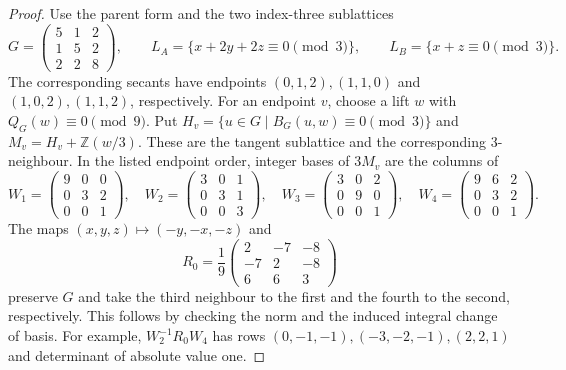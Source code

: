 \documentclass[11pt,letterpaper]{amsart}
\theoremstyle{definition}
\numberwithin{equation}{section}
\newcommand{\Z}{\mathbb Z}
\begin{document}
\begin{proof}
Use the parent form and the two index-three sublattices
\[
 G=\begin{pmatrix}5&1&2\\1&5&2\\2&2&8\end{pmatrix},\qquad
 L_A=\{x+2y+2z\equiv0\pmod3\},\qquad
 L_B=\{x+z\equiv0\pmod3\}.
\]
The corresponding secants have endpoints \((0,1,2),(1,1,0)\) and
\((1,0,2),(1,1,2)\), respectively. For an endpoint \(v\), choose a
lift \(w\) with \(Q_G(w)\equiv0\pmod9\). Put
\(H_v=\{u\in G\mid B_G(u,w)\equiv0\pmod3\}\) and
\(M_v=H_v+\Z(w/3)\). These are the tangent sublattice and the
corresponding 3-neighbour. In the listed endpoint order, integer
bases of \(3M_v\) are the columns of
\[
 W_1=\begin{pmatrix}9&0&0\\0&3&2\\0&0&1\end{pmatrix},\quad
 W_2=\begin{pmatrix}3&0&1\\0&3&1\\0&0&3\end{pmatrix},\quad
 W_3=\begin{pmatrix}3&0&2\\0&9&0\\0&0&1\end{pmatrix},\quad
 W_4=\begin{pmatrix}9&6&2\\0&3&2\\0&0&1\end{pmatrix}.
\]
The maps \((x,y,z)\mapsto(-y,-x,-z)\) and
\[
 R_0=\frac19\begin{pmatrix}2&-7&-8\\-7&2&-8\\6&6&3\end{pmatrix}
\]
preserve \(G\) and take the third neighbour to the first and the
fourth to the second, respectively. This follows by checking the
norm and the induced integral change of basis. For example,
\(W_2^{-1}R_0 W_4\) has rows \((0,-1,-1),(-3,-2,-1),(2,2,1)\)
and determinant of absolute value one.


\end{proof}
\end{document}
